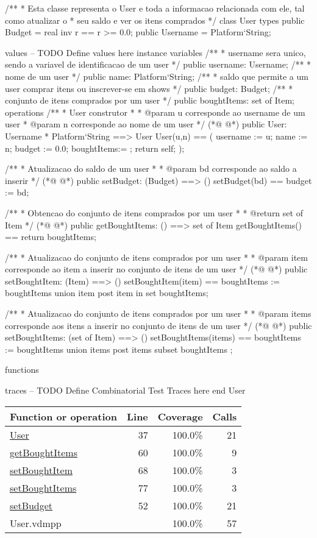 \begin{vdmpp}[breaklines=true]
/**
* Esta classe representa o User e toda a informacao relacionada com ele, tal como atualizar o
* seu saldo e ver os itens comprados
*/
class User
types
 public Budget = real
  inv r == r >= 0.0;
 public Username = Platform`String;
 
values
-- TODO Define values here
instance variables
 /**
 * username sera unico, sendo a variavel de identificacao de um user
 */
 public username: Username;
 /**
 * nome de um user
 */
 public name: Platform`String;
 /**
 * saldo que permite a um user comprar itens ou inscrever-se em shows
 */
 public budget: Budget;
 /**
 * conjunto de itens comprados por um user
 */
 public boughtItems: set of Item;
operations
 /**
 * User construtor
 * 
 * @param u corresponde ao username de um user
 * @param n corresponde ao nome de um user
 */
(*@
\label{User:37}
@*)
 public User: Username * Platform`String ==> User 
 User(u,n) == 
 (
  username := u;
  name := n;
  budget := 0.0;
  boughtItems:= {};
  return self;
 );
 
 /**
 * Atualizacao do saldo de um user
 * 
 * @param bd corresponde ao saldo a inserir
 */
(*@
\label{setBudget:52}
@*)
 public setBudget: (Budget) ==> ()
  setBudget(bd) == budget := bd;
 
 /**
 * Obtencao do conjunto de itens comprados por um user
 * 
 * @return set of Item
 */
(*@
\label{getBoughtItems:60}
@*)
 public getBoughtItems: () ==> set of Item
  getBoughtItems() == return boughtItems;
 
 /**
 * Atualizacao do conjunto de itens comprados por um user
 * 
 * @param item corresponde ao item a inserir no conjunto de itens de um user
 */
(*@
\label{setBoughtItem:68}
@*)
 public setBoughtItem: (Item) ==> ()
  setBoughtItem(item) == boughtItems := boughtItems union {item}
 post item in set boughtItems;
 
 /**
 * Atualizacao do conjunto de itens comprados por um user
 * 
 * @param items corresponde aos itens a inserir no conjunto de itens de um user
 */
(*@
\label{setBoughtItems:77}
@*)
 public setBoughtItems: (set of Item) ==> ()
  setBoughtItems(items) == boughtItems := boughtItems union items
 post items subset boughtItems ;
 
functions
 
traces
-- TODO Define Combinatorial Test Traces here
end User
\end{vdmpp}
\bigskip
\begin{longtable}{|l|r|r|r|}
\hline
Function or operation & Line & Coverage & Calls \\
\hline
\hline
\hyperref[User:37]{User} & 37&100.0\% & 21 \\
\hline
\hyperref[getBoughtItems:60]{getBoughtItems} & 60&100.0\% & 9 \\
\hline
\hyperref[setBoughtItem:68]{setBoughtItem} & 68&100.0\% & 3 \\
\hline
\hyperref[setBoughtItems:77]{setBoughtItems} & 77&100.0\% & 3 \\
\hline
\hyperref[setBudget:52]{setBudget} & 52&100.0\% & 21 \\
\hline
\hline
User.vdmpp & & 100.0\% & 57 \\
\hline
\end{longtable}

